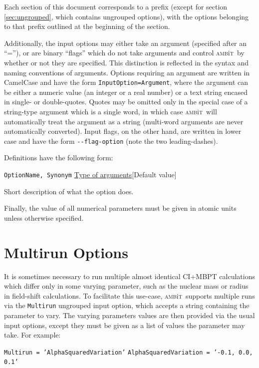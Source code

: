 \documentclass{report}
\newcommand{\ambit}{\textsc{amb}{\footnotesize i}\textsc{t}}
\begin{document}
Each section of this document corresponds to a prefix (except for section \ref{sec:ungrouped}, which
contains ungrouped options), with the options belonging to that prefix outlined at the beginning of the
section. 

Additionally, the input options may either take an argument (specified after an ``=''), or are binary
``flags'' which do not take arguments and control \ambit\ by whether or not they are specified. This
distinction is reflected in the syntax and naming conventions of arguments. Options requiring an
argument are written in CamelCase and have the form \texttt{InputOption=Argument}, where the argument
can be either a numeric value (an integer or a real number) or a text string encased in single- or
double-quotes. Quotes may be omitted only in the special case of a string-type argument which is a
single word, in which case \ambit\ will automatically treat the argument as a string (multi-word
arguments are never automatically converted). Input flags, on the other hand, are written in lower case 
and have the form \texttt{{-}{-}flag-option} (note the two leading-dashes). 

Definitions have the following form:

\texttt{OptionName, Synonym} \uline{Type of arguments}[Default value]
\begin{adjustwidth}{1cm}{}
Short description of what the option does.
\end{adjustwidth}

Finally, the value of all numerical parameters must be given in atomic units unless otherwise specified.

\section{Multirun Options}

\label{sec:multirun}

It is sometimes necessary to run multiple almost identical CI+MBPT calculations which differ only in
some varying parameter, such as the nuclear mass or radius in field-shift calculations. To facilitate
this use-case, \ambit\ supports multiple runs via the \texttt{Multirun} ungrouped input option, which
accepts a string containing the parameter to vary. The varying parameters values are then provided via 
the usual input options, except they must be given as a list of values the parameter may take. For 
example:

\texttt{Multirun = 'AlphaSquaredVariation'}
\texttt{AlphaSquaredVariation = '-0.1, 0.0, 0.1'}
\end{document}
